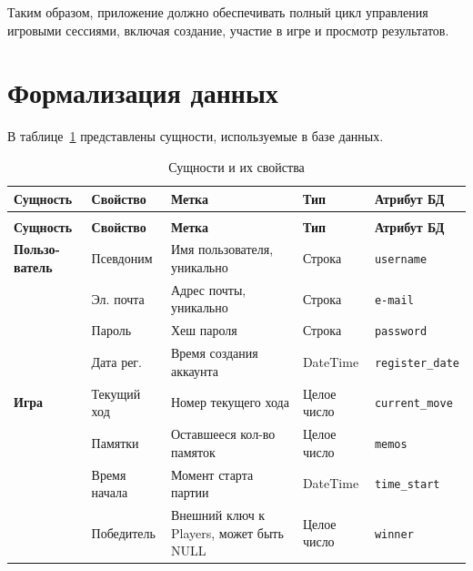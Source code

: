 Таким образом, приложение должно обеспечивать полный цикл управления игровыми
сессиями, включая создание, участие в игре и просмотр результатов.

\section{Формализация данных}

В таблице~\ref{tbl:data} представлены сущности, используемые в базе данных.

\begin{longtable}{|>{\raggedright\arraybackslash}p{}|>{\raggedright\arraybackslash}p{}|>{\raggedright\arraybackslash}p{}|>{\raggedright\arraybackslash}p{}|>{\raggedright\arraybackslash}p{}|}
	\caption{Сущности и их свойства} \label{tbl:data}
	\\
	\hline
	\textbf{Сущность} & \textbf{Свойство} & \textbf{Метка}
	                  & \textbf{Тип}      &
	\textbf{Атрибут БД}
	\\
	\hline
	\endfirsthead
	\caption{Сущности и их свойства}
	\\
	\hline
	\textbf{Сущность} & \textbf{Свойство} & \textbf{Метка}
	                  & \textbf{Тип}      & \textbf{Атрибут БД}
	\\
	\hline
	\endhead
	\hline
	\endfoot
	\endlastfoot

	\textbf{Пользо-\newline ватель}
	                  & Псевдоним         & Имя пользователя, уникально
	                  & Строка            & \texttt{username}
	\\
	\cline{2-5}
	                  & Эл. почта         & Адрес почты, уникально
	                  & Строка            & \texttt{e-mail}
	\\
	\cline{2-5}
	                  & Пароль            & Хеш пароля
	                  & Строка            & \texttt{password}
	\\
	\cline{2-5}
	                  & Дата рег.         & Время создания аккаунта
	                  & DateTime          &
	\texttt{register\_\newline date}
	\\
	\hline

	\textbf{Игра}
	                  & Текущий ход       & Номер текущего хода
	                  & Целое число       &
	\texttt{current\_move}
	\\
	\cline{2-5}
	                  & Памятки           & Оставшееся кол-во памяток
	                  & Целое число       & \texttt{memos}
	\\
	\cline{2-5}
	                  & Время начала      & Момент старта партии
	                  & DateTime          & \texttt{time\_start}
	\\
	\cline{2-5}
	                  & Победитель        & Внешний ключ к Players, может
	быть NULL         & Целое число       &
	\texttt{winner}
	\\
	\hline


\end{longtable}
